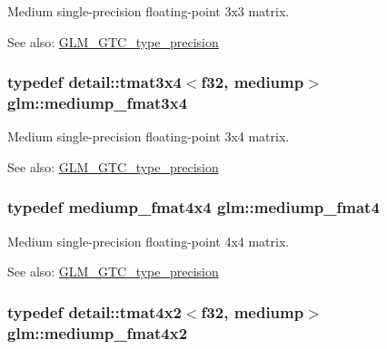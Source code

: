 Medium single-precision floating-point 3x3 matrix. \begin{Desc}
\item[See also:]\hyperlink{group__gtc__type__precision}{GLM\_\-GTC\_\-type\_\-precision} \end{Desc}
\hypertarget{group__gtc__type__precision_gfa5aaa948365f349840dfeb9eeebf0cd}{
\subsubsection[mediump\_\-fmat3x4]{\setlength{\rightskip}{0pt plus 5cm}typedef detail::tmat3x4$<$f32, mediump$>$ {\bf glm::mediump\_\-fmat3x4}}}
\label{group__gtc__type__precision_gfa5aaa948365f349840dfeb9eeebf0cd}


Medium single-precision floating-point 3x4 matrix. \begin{Desc}
\item[See also:]\hyperlink{group__gtc__type__precision}{GLM\_\-GTC\_\-type\_\-precision} \end{Desc}
\hypertarget{group__gtc__type__precision_g6cd3ae1f3509b79061edcc83564769d4}{
\subsubsection[mediump\_\-fmat4]{\setlength{\rightskip}{0pt plus 5cm}typedef mediump\_\-fmat4x4 {\bf glm::mediump\_\-fmat4}}}
\label{group__gtc__type__precision_g6cd3ae1f3509b79061edcc83564769d4}


Medium single-precision floating-point 4x4 matrix. \begin{Desc}
\item[See also:]\hyperlink{group__gtc__type__precision}{GLM\_\-GTC\_\-type\_\-precision} \end{Desc}
\hypertarget{group__gtc__type__precision_g09a2851d38fe3cf52735a1d26199bdcc}{
\subsubsection[mediump\_\-fmat4x2]{\setlength{\rightskip}{0pt plus 5cm}typedef detail::tmat4x2$<$f32, mediump$>$ {\bf glm::mediump\_\-fmat4x2}}}
\label{group__gtc__type__precision_g09a2851d38fe3cf52735a1d26199bdcc}


